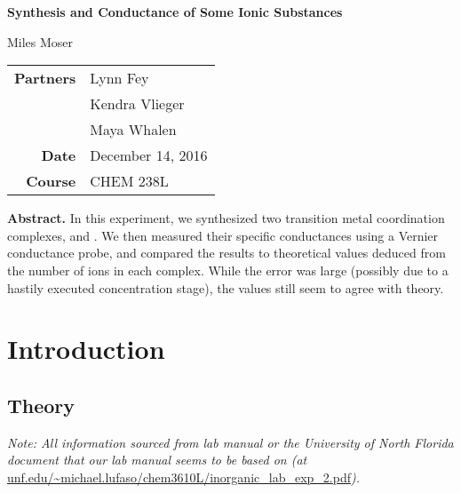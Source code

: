 \documentclass{article}
\renewcommand{\Title}{Synthesis and Conductance of Some Ionic Substances}
\renewcommand{\Course}{CHEM 238L}
\renewcommand{\Date}{December 14, 2016}
\renewcommand{\Author}{Miles Moser}
\begin{document}
\fancyhfoffset[O]{0pt}  %

\hypersetup{pageanchor=false}   %
\begin{titlepage}
\vspace*{\fill}
\begin{center}
\begin{Large}
    \textbf{\Title}\\[0.5cm]
\end{Large}
\begin{large}
    \Author\\[0.4cm]
\end{large}
\begin{table}[H]
\centering
\begin{tabular}{r l}
\midrule
\textbf{Partners} & Lynn Fey \\ %
& Kendra Vlieger \\
& Maya Whalen \\
\textbf{Date} & \Date \\
\textbf{Course} & \Course \\
\midrule
\end{tabular}
\end{table}
\end{center}

\textbf{Abstract. } In this experiment, we synthesized two transition metal coordination complexes,  and . We then measured their specific conductances using a Vernier conductance probe, and compared the results to theoretical values deduced from the number of ions in each complex. While the error was large (possibly due to a hastily executed concentration stage), the values still seem to agree with theory.
\vspace*{\fill}
\end{titlepage}
\hypersetup{pageanchor=true}

\section{Introduction}

\subsection{Theory}
\begin{small}
\textit{Note: All information sourced from lab manual or the University of North Florida document that our lab manual seems to be based on (at} \url{unf.edu/~michael.lufaso/chem3610L/inorganic_lab_exp_2.pdf}\textit{).}
\end{small}
\end{document}
